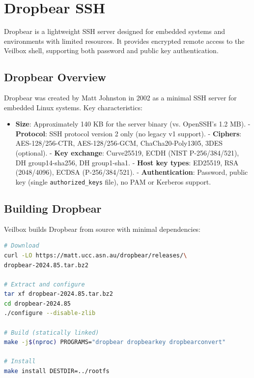 \chapter{Dropbear SSH}
\label{ch:dropbear}

Dropbear is a lightweight SSH server designed for embedded systems and
environments with limited resources. It provides encrypted remote access
to the Veilbox shell, supporting both password and public key
authentication.

\section{Dropbear Overview}

Dropbear was created by Matt Johnston in 2002 as a minimal SSH server
for embedded Linux systems. Key characteristics:

\begin{itemize}[nosep]
  \item \textbf{Size}: Approximately 140 KB for the server binary
        (vs. OpenSSH's 1.2 MB).
  - \textbf{Protocol}: SSH protocol version 2 only (no legacy v1 support).
  - \textbf{Ciphers}: AES-128/256-CTR, AES-128/256-GCM, ChaCha20-Poly1305,
        3DES (optional).
  - \textbf{Key exchange}: Curve25519, ECDH (NIST P-256/384/521),
        DH group14-sha256, DH group1-sha1.
  - \textbf{Host key types}: ED25519, RSA (2048/4096), ECDSA (P-256/384/521).
  - \textbf{Authentication}: Password, public key (single
        \texttt{authorized\_keys} file), no PAM or Kerberos support.
\end{itemize}

\section{Building Dropbear}

Veilbox builds Dropbear from source with minimal dependencies:

\begin{lstlisting}[language=bash]
# Download
curl -LO https://matt.ucc.asn.au/dropbear/releases/\
dropbear-2024.85.tar.bz2

# Extract and configure
tar xf dropbear-2024.85.tar.bz2
cd dropbear-2024.85
./configure --disable-zlib

# Build (statically linked)
make -j$(nproc) PROGRAMS="dropbear dropbearkey dropbearconvert"

# Install
make install DESTDIR=../rootfs
\end{lstlisting}

